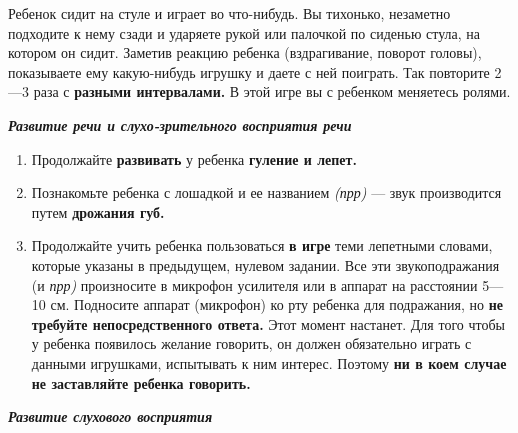 \documentclass{book}
\renewcommand{\emph}[1]{\textit{#1}}
\begin{document}
Ребенок сидит на стуле и играет во что-нибудь. Вы тихонько, незаметно
подходите к нему сзади и ударяете рукой или палочкой по сиденью стула,
на котором он сидит. Заметив реакцию ребенка (вздрагивание, поворот
головы), показываете ему какую-нибудь игрушку и даете с ней поиграть.
Так повторите 2---3 раза с \textbf{разными интервалами.} В этой игре вы
с ребенком меняетесь ролями.

\emph{\textbf{Развитие речи и слухо-зрительного восприятия речи}}


\begin{enumerate}
\def\labelenumi{\arabic{enumi}.}
\item
  
  Продолжайте \textbf{развивать} у ребенка \textbf{гуление и лепет.}
  
\item
  
  Познакомьте ребенка с лошадкой и ее названием \emph{(прр)} --- звук
  производится путем \textbf{дрожания губ.}
  
\item
  
  Продолжайте учить ребенка пользоваться \textbf{в игре} теми лепетными
  словами, которые указаны в предыдущем, нулевом задании. Все эти
  звукоподражания (и \emph{прр)} произносите в микрофон усилителя или в
  аппарат на расстоянии 5---10 см. Подносите аппарат (микрофон) ко рту
  ребенка для подражания, но \textbf{не требуйте непосредственного
  ответа.} Этот момент настанет. Для того чтобы у ребенка появилось
  желание говорить, он должен обязательно играть с данными игрушками,
  испытывать к ним интерес. Поэтому \textbf{ни в коем случае не
  заставляйте ребенка говорить.}
  
\end{enumerate}


\emph{\textbf{Развитие слухового восприятия}}
\end{document}
